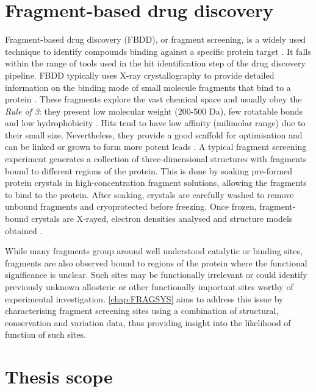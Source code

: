 \section{Fragment-based drug discovery}

Fragment-based drug discovery (FBDD), or fragment screening, is a widely used technique to identify compounds binding against a specific protein target \cite{MURRAY_2009_FBDD}. It falls within the range of tools used in the hit identification step of the drug discovery pipeline. FBDD typically uses X-ray crystallography to provide detailed information on the binding mode of small molecule fragments that bind to a protein \cite{REES_2004_FBLD}. These fragments explore the vast chemical space and usually obey the \textit{Rule of 3}: they present low molecular weight (200-500 Da), few rotatable bonds and low hydrophobicity \cite{CONGREVE_2003_RO3}. Hits tend to have low affinity (milimolar range) due to their small size. Nevertheless, they provide a good scaffold for optimisation and can be linked or grown to form more potent leads \cite{SCHIEBEL_2016_FRAGMENTS}. A typical fragment screening experiment generates a collection of three-dimensional structures with fragments bound to different regions of the protein. This is done by soaking pre-formed protein crystals in high-concentration fragment solutions, allowing the fragments to bind to the protein. After soaking, crystals are carefully washed to remove unbound fragments and cryoprotected before freezing. Once frozen, fragment-bound crystals are X-rayed, electron densities analysed and structure models obtained \cite{PATEL_2014_FS}.

While many fragments group around well understood catalytic or binding sites, fragments are also observed bound to regions of the protein where the functional significance is unclear. Such sites may be functionally irrelevant or could identify previously unknown allosteric or other functionally important sites worthy of experimental investigation. \autoref{chap:FRAGSYS} aims to address this issue by characterising fragment screening sites using a combination of structural, conservation and variation data, thus providing insight into the likelihood of function of such sites.

\section{Thesis scope}

